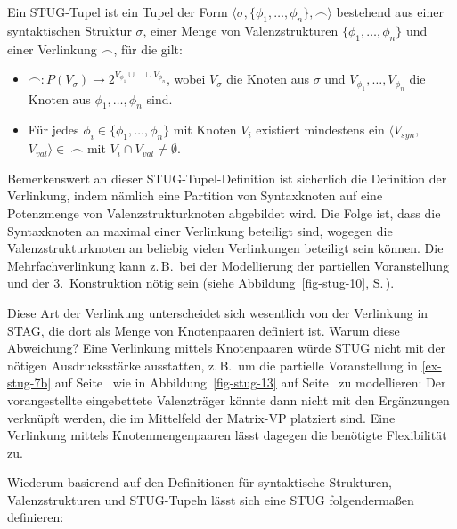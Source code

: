 \begin{definition}
Ein STUG-Tupel ist ein Tupel der Form $\langle \sigma,\{\phi_1,$\linebreak $\ldots,\phi_n\}, \frown\rangle$ bestehend aus einer syntaktischen Struktur $\sigma$, einer Menge von Valenzstrukturen $\{\phi_1,\ldots,\phi_n\}$ und einer Verlinkung $\frown$, für die gilt:
\begin{itemize}
  \item $\frown: P(V_\sigma) \to 2^{V_{\phi_1} \cup \ldots \cup V_{\phi_n}}$, wobei $V_\sigma$ die Knoten aus $\sigma$ und $V_{\phi_1}, \ldots, V_{\phi_n}$ die Knoten aus $\phi_1,\ldots,\phi_n$ sind.
  \item Für jedes $\phi_i \in \{\phi_1,\ldots,\phi_n\}$ mit Knoten $V_i$ existiert mindestens ein $\langle V_{\mathit{syn}},$ $V_{\mathit{val}}\rangle \in \ \frown$ mit $V_i \cap V_{\mathit{val}} \ne \emptyset$.
\end{itemize}
\end{definition}
Bemerkenswert an dieser STUG-Tupel-Definition ist sicherlich die Definition der Verlinkung, indem nämlich eine Partition von Syntaxknoten auf eine Potenzmenge von Valenzstrukturknoten abgebildet wird. Die Folge ist, dass die Syntaxknoten an maximal einer Verlinkung beteiligt sind, wogegen die Valenzstrukturknoten an beliebig vielen Verlinkungen beteiligt sein können. Die Mehrfachverlinkung kann z.\,B.\ bei der Modellierung der partiellen Voranstellung und der 3.~Konstruktion nötig sein (siehe Abbildung~\ref{fig-stug-10}, S.\,\pageref{fig-stug-10}).     

Diese Art der Verlinkung unterscheidet sich wesentlich von der Verlinkung in STAG, die dort als Menge von Knotenpaaren definiert ist. Warum diese Abweichung? Eine Verlinkung mittels Knotenpaaren würde STUG nicht mit der nötigen Ausdrucksstärke ausstatten, z.\,B.\ um die partielle Voranstellung in \ref{ex-stug-7b} auf Seite~\pageref{ex-stug-7b} wie in Abbildung~\ref{fig-stug-13} auf Seite~\pageref{fig-stug-13} zu modellieren: Der vorangestellte eingebettete Valenzträger könnte dann nicht mit den Ergänzungen verknüpft werden, die im Mittelfeld der Matrix-VP platziert sind. Eine Verlinkung mittels Knotenmengenpaaren lässt dagegen die benötigte Flexibilität zu.   

Wiederum basierend auf den Definitionen für syntaktische Strukturen, Valenzstrukturen und STUG-Tupeln lässt sich eine STUG folgenderma\ss en definieren:

